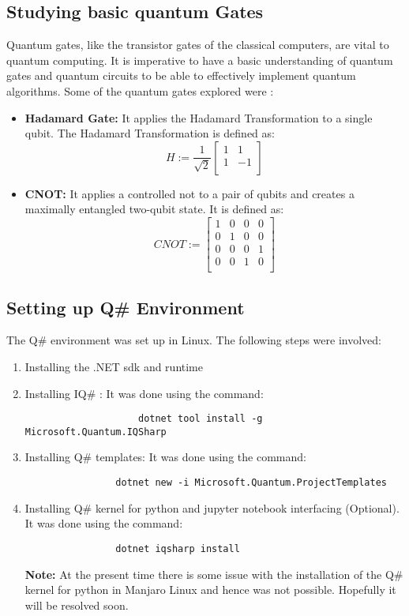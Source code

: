 \documentclass[]{article}
\begin{document}
		\subsection{Studying basic quantum Gates}
			Quantum gates, like the transistor gates of the classical computers, are vital to quantum computing. It is imperative to have a basic understanding of quantum gates and quantum circuits to be able to effectively implement quantum algorithms.  Some of the quantum gates explored were \cite{1}:
			\begin{itemize}
				\item \textbf{Hadamard Gate:} It applies the Hadamard Transformation to a single qubit. The Hadamard Transformation is defined as:
					\[ 	H:= \frac{1}{\sqrt{2}} 
						\begin{bmatrix}
						1 & 1 \\
						1 & -1\\
						\end{bmatrix}
					\] 
				\item \textbf{CNOT:} It applies a controlled not to a pair of qubits and creates a maximally entangled two-qubit state. It is defined as:
					\[ 	CNOT:= 
					\begin{bmatrix}
					1 & 0 & 0 & 0 \\
					0 & 1 & 0 & 0 \\
					0 & 0 & 0 & 1 \\
					0 & 0 & 1 & 0 \\
					\end{bmatrix}
					\] 
			\end{itemize}
		
		\subsection{Setting up Q\# Environment}
			The Q\# environment was set up in Linux. The following steps were involved:
			\begin{enumerate}
				\item Installing the .NET sdk and runtime \cite{2}
				\item Installing IQ\# : It was done using the command:
					\begin{verbatim}
					dotnet tool install -g Microsoft.Quantum.IQSharp
					\end{verbatim}
				\item Installing Q\# templates:  It was done using the command:
				\begin{verbatim}
				dotnet new -i Microsoft.Quantum.ProjectTemplates
				\end{verbatim}
				\item Installing Q\# kernel for python and jupyter notebook interfacing (Optional). It was done using the command:
				\begin{verbatim}
				dotnet iqsharp install
				\end{verbatim}
				\textbf{Note:} At the present time there is some issue with the installation of the Q\# kernel for python in Manjaro Linux and hence was not possible. Hopefully it will be resolved soon.
			\end{enumerate}
		
\end{document}
